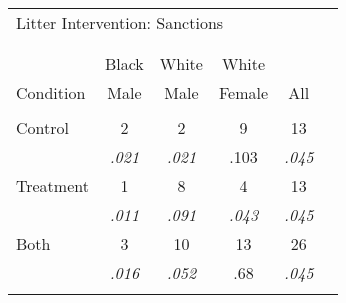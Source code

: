 \documentclass{standalone}
\begin{document}


\begin{tabular}{lccccc}
\multicolumn{5}{l}{Litter Intervention: Sanctions}\\[-1.0ex] 
\\[-1.8ex]\hline 
\hline \\[-1.8ex] 
          & Black  & White  & White  &   \\
Condition & Male   &   Male &  Female & All\\
\hline \\[-1.8ex] 
Control   & 2          &     2      &         9 & 13\\
          &\textit{.021}      &    \textit{.021}  &     .103 & \textit{.045} \\
Treatment & 1          &     8      &         4 & 13\\
          &\textit{.011}      &    \textit{.091}  &    \textit{.043} & \textit{.045}  \\
Both      & 3          &    10      &        13 & 26 \\
          &\textit{.016}      &   \textit{.052}        & .68      &  \textit{.045} \\
\hline \\[-1.8ex]
\end{tabular}
\end{document}
